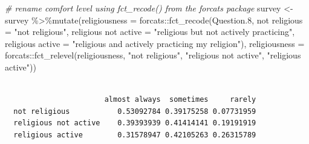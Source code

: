 \documentclass[
]{book}
\newenvironment{Shaded}{\begin{snugshade}}{\end{snugshade}}
\newcommand{\AttributeTok}[1]{\textcolor[rgb]{0.77,0.63,0.00}{#1}}
\newcommand{\CommentTok}[1]{\textcolor[rgb]{0.56,0.35,0.01}{\textit{#1}}}
\newcommand{\DecValTok}[1]{\textcolor[rgb]{0.00,0.00,0.81}{#1}}
\newcommand{\FloatTok}[1]{\textcolor[rgb]{0.00,0.00,0.81}{#1}}
\newcommand{\FunctionTok}[1]{\textcolor[rgb]{0.00,0.00,0.00}{#1}}
\newcommand{\NormalTok}[1]{#1}
\newcommand{\OtherTok}[1]{\textcolor[rgb]{0.56,0.35,0.01}{#1}}
\newcommand{\SpecialCharTok}[1]{\textcolor[rgb]{0.00,0.00,0.00}{#1}}
\newcommand{\StringTok}[1]{\textcolor[rgb]{0.31,0.60,0.02}{#1}}
\begin{document}
\begin{Shaded}
\begin{Highlighting}[]
\CommentTok{\# rename comfort level using fct\_recode() from the forcats package}
\NormalTok{survey }\OtherTok{\textless{}{-}}\NormalTok{ survey }\SpecialCharTok{\%\textgreater{}\%}\FunctionTok{mutate}\NormalTok{(}\AttributeTok{religiousness =}\NormalTok{ forcats}\SpecialCharTok{::}\FunctionTok{fct\_recode}\NormalTok{(Question}\FloatTok{.8}\NormalTok{, }
                          \StringTok{\textasciigrave{}}\AttributeTok{not religious}\StringTok{\textasciigrave{}} \OtherTok{=} \StringTok{"not religious"}\NormalTok{,}
                          \StringTok{\textasciigrave{}}\AttributeTok{religious not active}\StringTok{\textasciigrave{}} \OtherTok{=} \StringTok{"religious but not actively practicing"}\NormalTok{,}
                          \StringTok{\textasciigrave{}}\AttributeTok{religious active}\StringTok{\textasciigrave{}} \OtherTok{=} \StringTok{"religious and actively practicing my religion"}\NormalTok{),}
                          \AttributeTok{religiousness =}\NormalTok{ forcats}\SpecialCharTok{::}\FunctionTok{fct\_relevel}\NormalTok{(religiousness,}
                                                               \StringTok{"not religious"}\NormalTok{,}
                                                               \StringTok{"religious not active"}\NormalTok{,}
                                                               \StringTok{"religious active"}\NormalTok{))}
\end{Highlighting}
\end{Shaded}

\begin{Shaded}
\end{Shaded}

\begin{verbatim}
                      
                       almost always  sometimes     rarely
  not religious           0.53092784 0.39175258 0.07731959
  religious not active    0.39393939 0.41414141 0.19191919
  religious active        0.31578947 0.42105263 0.26315789
\end{verbatim}
\end{document}
